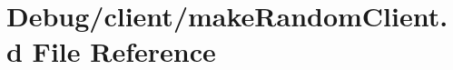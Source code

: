 \hypertarget{makeRandomClient_8d}{\section{Debug/client/make\-Random\-Client.d File Reference}
\label{makeRandomClient_8d}
}
